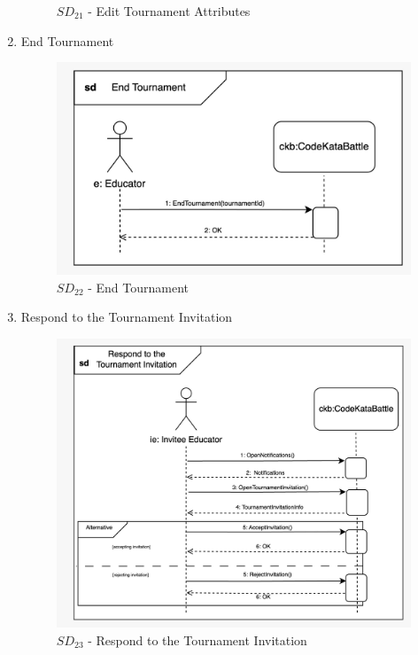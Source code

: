 \begin{enumerate}
\begin{figure}[H]
        \caption{$SD_{21}$ - Edit Tournament Attributes}
    \end{figure}
    \item End Tournament
    \begin{figure}[H]
        \centering
        \includegraphics[scale=0.2]{Images/sequence_diagrams/SD-end_tournament.jpeg}
        \caption{$SD_{22}$ - End Tournament}
    \end{figure}
    \newpage
    \item Respond to the Tournament Invitation
    \begin{figure}[H]
        \centering
        \includegraphics[scale=0.2]{Images/sequence_diagrams/SD-respond_to_tournament_invitation.jpeg}
        \caption{$SD_{23}$ - Respond to the Tournament Invitation}
    \end{figure}

\end{enumerate}
